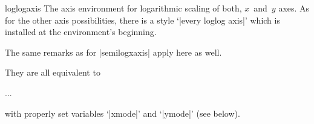 \begin{environment}{{loglogaxis}}
The axis environment for logarithmic scaling of both, $x$~and~$y$ axes.
As for the other axis possibilities, there is a style `|every loglog axis|' which is installed at the environment's beginning.

The same remarks as for |semilogxaxis| apply here as well.
\end{environment}

\noindent
They are all equivalent to
\begin{codeexample}
\begin{axis}[
	xmode=log|normal,
	ymode=log|normal]
...
\end{axis}
\end{codeexample}
\noindent
with properly set variables `|xmode|' and `|ymode|' (see below).

